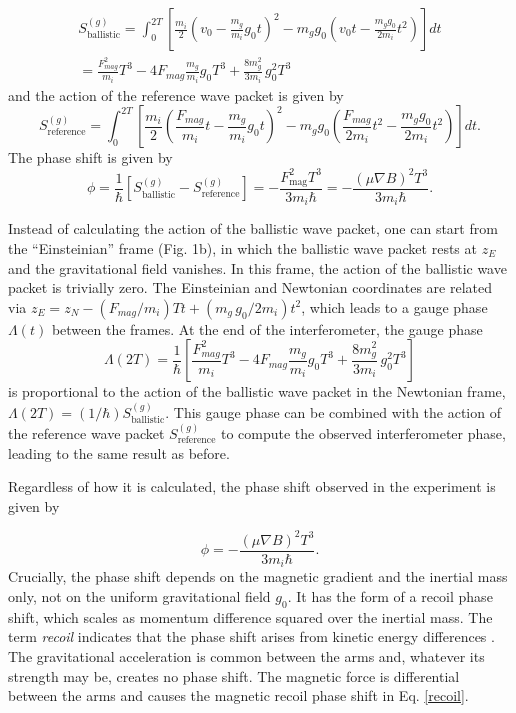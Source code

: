 \documentclass[aps,prl,reprint,onecolumn,nofootinbib,groupedaddress]{revtex4-2}
\begin{document}
\begin{align}
S^{(g)}_\text{ballistic} = \int_{0}^{2T} \left[ \frac{m_i}{2} \left( v_0 - \frac{m_g}{m_i} g_0 t\right)^2 -m_g g_0 \left( v_0 t - \frac{m_g g_0}{2 m_i}t^2\right) \right] dt \\
=\frac{F_{mag}^2}{m_i} T^3 - 4 F_{mag} \frac{m_g}{m_i} g_0 T^3 + \frac{8 m_g^2}{3 m_i}\, g_0^2  T^3
\end{align}
and the action of the reference wave packet is given by 
\begin{equation}
S^{(g)}_\text{reference} = \int_{0}^{2T} \left[ \frac{m_i}{2} \left(\frac{F_{mag}}{m_i}t - \frac{m_g}{m_i} g_0 t\right)^2 -m_g g_0 \left(\frac{F_{mag}}{2m_i} t^2 - \frac{m_g g_0}{2m_i} t^2\right) \right] dt.
\end{equation}
The phase shift is given by 
\begin{equation}
\phi = \frac{1}{\hbar} \left[ S^{(g)}_\text{ballistic} - S^{(g)}_\text{reference} \right] = -\frac{F_\text{mag}^2 T^3}{3 m_i\hbar} = -\frac{(\mu \nabla B )^2 T^3}{3 m_i\hbar}.
\end{equation}

Instead of calculating the action of the ballistic wave packet, one can start from the ``Einsteinian'' frame (Fig. 1b), in which the ballistic wave packet rests at $z_E$ and the gravitational field vanishes. In this frame, the action of the ballistic wave packet is trivially zero. The Einsteinian and Newtonian coordinates are related via  $z_E=z_N - (F_{mag}/m_i) T t+ (m_g\, g_0/2 m_i) t^2$, which leads to a gauge phase $\Lambda(t)$ between the frames.  At the end of the interferometer, the gauge phase 
\begin{equation}
\Lambda(2T) = \frac{1}{\hbar} \left[\frac{F_{mag}^2}{m_i} T^3 - 4 F_{mag} \frac{m_g}{m_i} g_0 T^3 + \frac{8m_g^2}{3 m_i}\, g_0^2 T^3 \right]
\end{equation}
is proportional to the action of the ballistic wave packet in the Newtonian frame, $\Lambda(2T)= (1/\hbar) S^{(g)}_\text{ballistic}$.  
This gauge phase can be combined with the action of the reference wave packet $S^{(g)}_\text{reference}$ to compute the observed interferometer phase, leading to the same result as before.  

Regardless of how it is calculated, the phase shift observed in the experiment is given by 

\begin{equation}
\boxed{\phi={-\frac{(\mu \nabla B )^2 T^3}{3 m_i\hbar}}.}
\label{recoil}
\end{equation}
Crucially, the phase shift depends on the magnetic gradient and the inertial mass only, not on the uniform gravitational field $g_0$.
It has the form of a recoil phase shift, which scales as momentum difference squared over the inertial mass. The term \textit{recoil} indicates that the phase shift arises from kinetic energy differences \cite{Bongs2006}. The gravitational acceleration is common between the arms and, whatever its strength may be, creates no phase shift. The magnetic force is differential between the arms and causes the magnetic recoil phase shift in Eq. \ref{recoil}.  
\end{document}

